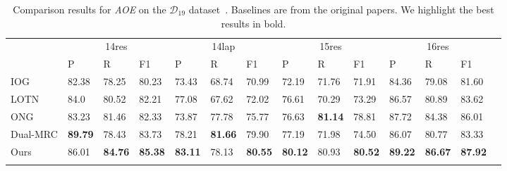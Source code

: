 \documentclass[11pt,a4paper]{article}
\begin{document}
\begin{table*}[ht]
  \centering\small
  \setlength{\tabcolsep}{0.75pt} \renewcommand{\arraystretch}{1.3}
  \begin{tabular}{m{2.5cm}m{1.065cm}<{\centering}m{1.065cm}<{\centering}m{1.065cm}<{\centering}|m{1.065cm}<{\centering}m{1.065cm}<{\centering}m{1.065cm}<{\centering}|m{1.065cm}<{\centering}m{1.065cm}<{\centering}m{1.065cm}<{\centering}|m{1.065cm}<{\centering}m{1.065cm}<{\centering}m{1.065cm}<{\centering}m{1.065cm}<{\centering}}
    \Xhline{0.08em}
    \multirow{2}{*}{Model} & \multicolumn{3}{c|}{14res} & \multicolumn{3}{c|}{14lap} & \multicolumn{3}{c|}{15res} & \multicolumn{3}{c}{16res} \\
    \cline{2-13}
    & P       & R      & F1     & P       & R      & F1     & P       & R      & F1     & P       & R      & F1     \\
    \cline{1-13}
    IOG                    & 82.38   & 78.25  & 80.23  & 73.43   & 68.74  & 70.99  & 72.19   & 71.76  & 71.91  & 84.36   & 79.08  & 81.60   \\
  LOTN                   & 84.0      & 80.52  & 82.21  & 77.08   & 67.62  & 72.02  & 76.61   & 70.29  & 73.29  & 86.57   & 80.89  & 83.62  \\
  ONG                    & 83.23   & 81.46  & 82.33  & 73.87   & 77.78  & 75.77  & 76.63   & \textbf{81.14}  & 78.81  & 87.72   & 84.38  & 86.01  \\
  Dual-MRC               & \textbf{89.79}   & 78.43  & 83.73  & 78.21   & \textbf{81.66}  & 79.90   & 77.19   & 71.98  & 74.50   & 86.07   & 80.77  & 83.33  \\
    \Xhline{0.05em}
    Ours                   & 86.01    & \textbf{84.76}  & \textbf{85.38}  & \textbf{83.11}   & 78.13  & \textbf{80.55}  & \textbf{80.12}   & 80.93  & \textbf{80.52}  & \textbf{89.22}   & \textbf{86.67}   & \textbf{87.92}  \\
  \Xhline{0.08em}
  \end{tabular}
  \caption{Comparison results for \emph{AOE}  on the  $\mathcal{D}_{19}$ dataset~\citep{DBLP:conf/naacl/FanWDHC19}. Baselines are from  the original papers. We highlight the best results in bold.}
  \label{tb:fan}
  \end{table*}
\end{document}
